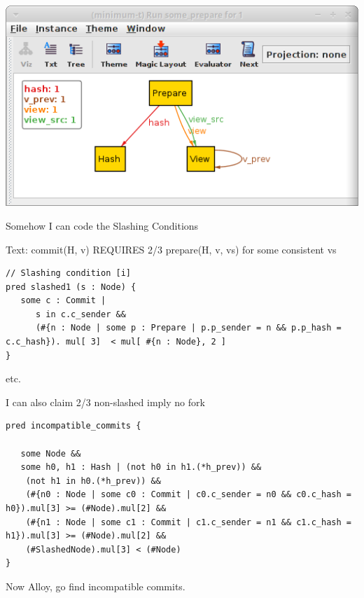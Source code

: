\documentclass{beamer}
\begin{document}
\begin{frame}
\includegraphics[width=\textwidth]{circle.png}
\end{frame}

\begin{frame}[fragile]{Somehow I can code the Slashing Conditions}

Text: commit(H, v) REQUIRES 2/3 prepare(H, v, vs) for some consistent vs

\begin{verbatim}
// Slashing condition [i]
pred slashed1 (s : Node) {
   some c : Commit |
      s in c.c_sender &&
      (#{n : Node | some p : Prepare | p.p_sender = n && p.p_hash = c.c_hash}). mul[ 3]  < mul[ #{n : Node}, 2 ]
}
\end{verbatim}

etc.
\end{frame}

\begin{frame}{I can also claim 2/3 non-slashed imply no fork}


\begin{verbatim}
pred incompatible_commits {

   some Node &&
   some h0, h1 : Hash | (not h0 in h1.(*h_prev)) &&
    (not h1 in h0.(*h_prev)) &&
    (#{n0 : Node | some c0 : Commit | c0.c_sender = n0 && c0.c_hash = h0}).mul[3] >= (#Node).mul[2] &&
    (#{n1 : Node | some c1 : Commit | c1.c_sender = n1 && c1.c_hash = h1}).mul[3] >= (#Node).mul[2] &&
    (#SlashedNode).mul[3] < (#Node)
}
\end{verbatim}

Now Alloy, go find incompatible commits.
\end{frame}
\end{document}

